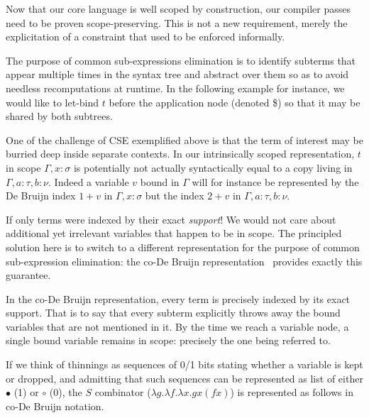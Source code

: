 

Now that our core language is well scoped by construction, our compiler passes
need to be proven scope-preserving.
%
This is not a new requirement, merely the explicitation of a constraint that
used to be enforced informally.


The purpose of common sub-expressions elimination is to identify subterms
that appear multiple times in the syntax tree and abstract over them so
as to avoid needless recomputations at runtime.
%
In the following example for instance, we would like to let-bind $t$ before
the application node (denoted \$) so that it may be shared by both subtrees.

\cseexamplegraph{}

One of the challenge of CSE exemplified above is that the term of interest
may be burried deep inside separate contexts. In our intrinsically scoped
representation, $t$ in scope $\Gamma, x : \sigma$ is potentially not actually
syntactically equal to a copy living in $\Gamma, a : \tau, b : \nu$.
%
Indeed a variable $v$ bound in $\Gamma$ will for instance be represented by
the De Bruijn index $1+v$ in $\Gamma, x : \sigma$
but the index $2+v$ in $\Gamma, a :  \tau, b : \nu$.

If only terms were indexed by their exact \emph{support}! We would not care
about additional yet irrelevant variables that happen to be in scope.
%
The principled solution here is to switch to a different representation for
the purpose of common sub-expression elimination: the co-De Bruijn
representation~\cite{DBLP:journals/corr/abs-1807-04085} provides exactly this guarantee.


In the co-De Bruijn representation, every term is precisely indexed by its
exact support.
%
That is to say that every subterm explicitly throws away the bound variables
that are not mentioned in it.
%
By the time we reach a variable node, a single  bound variable remains in scope:
precisely the one being referred to.

If we think of thinnings as sequences of 0/1 bits stating whether a variable
is kept or dropped, and admitting that such sequences can be represented as
list of either $\bullet$ (1) or $\circ$ (0), the $S$ combinator
($\lambda g. \lambda f. \lambda x. g x (f x)$) is represented as follows in
co-De Bruijn notation.

